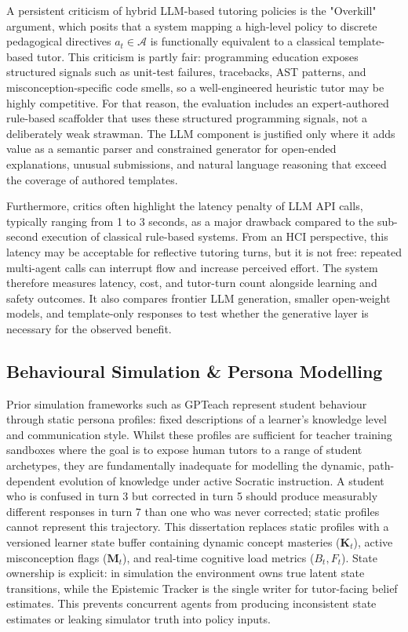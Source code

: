 \documentclass[11pt,a4paper]{report}
\begin{document}
A persistent criticism of hybrid LLM-based tutoring policies is the "Overkill" argument, which posits that a system mapping a high-level policy to discrete pedagogical directives $a_t \in \mathcal{A}$ is functionally equivalent to a classical template-based tutor. This criticism is partly fair: programming education exposes structured signals such as unit-test failures, tracebacks, AST patterns, and misconception-specific code smells, so a well-engineered heuristic tutor may be highly competitive. For that reason, the evaluation includes an expert-authored rule-based scaffolder that uses these structured programming signals, not a deliberately weak strawman. The LLM component is justified only where it adds value as a semantic parser and constrained generator for open-ended explanations, unusual submissions, and natural language reasoning that exceed the coverage of authored templates.

Furthermore, critics often highlight the latency penalty of LLM API calls, typically ranging from 1 to 3 seconds, as a major drawback compared to the sub-second execution of classical rule-based systems. From an HCI perspective, this latency may be acceptable for reflective tutoring turns, but it is not free: repeated multi-agent calls can interrupt flow and increase perceived effort. The system therefore measures latency, cost, and tutor-turn count alongside learning and safety outcomes. It also compares frontier LLM generation, smaller open-weight models, and template-only responses to test whether the generative layer is necessary for the observed benefit.

\subsection{Behavioural Simulation \& Persona Modelling}
Prior simulation frameworks such as GPTeach \cite{markel2023gpteach} represent student behaviour through static persona profiles: fixed descriptions of a learner's knowledge level and communication style. Whilst these profiles are sufficient for teacher training sandboxes where the goal is to expose human tutors to a range of student archetypes, they are fundamentally inadequate for modelling the dynamic, path-dependent evolution of knowledge under active Socratic instruction. A student who is confused in turn 3 but corrected in turn 5 should produce measurably different responses in turn 7 than one who was never corrected; static profiles cannot represent this trajectory. This dissertation replaces static profiles with a versioned learner state buffer containing dynamic concept masteries ($\mathbf{K}_t$), active misconception flags ($\mathbf{M}_t$), and real-time cognitive load metrics ($B_t, F_t$). State ownership is explicit: in simulation the environment owns true latent state transitions, while the Epistemic Tracker is the single writer for tutor-facing belief estimates. This prevents concurrent agents from producing inconsistent state estimates or leaking simulator truth into policy inputs.
\end{document}
